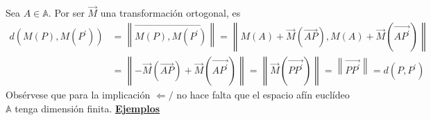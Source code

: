 \documentclass[12pt, a4paper, ones, notitlepage, openany,titlepage]{article}
\newcommand{\ejemplos}{\noindent\underline{\textbf{Ejemplos}}}
\begin{document}
{}{
	Sea $A \in \mathbb{A}$. Por ser $\overrightarrow{M}$ una transformación ortogonal, es
	$$
	\begin{aligned}
		d\left(M(P), M\left(P^{\prime}\right)\right) & =\left\|\overrightarrow{M(P), M\left(P^{\prime}\right)}\right\|=\left\|M(A)+\overrightarrow{M}(\overrightarrow{A P}), M(A)+\overrightarrow{M}\left(\overrightarrow{A P^{\prime}}\right)\right\| \\
		& =\left\|-\overrightarrow{M}(\overrightarrow{A P})+\overrightarrow{M}\left(\overrightarrow{A P^{\prime}}\right)\right\|=\left\|\overrightarrow{M}\left(\overrightarrow{P P^{\prime}}\right)\right\|=\left\|\overrightarrow{P P^{\prime}}\right\|=d\left(P, P^{\prime}\right)
	\end{aligned}
	$$
	Obsérvese que para la implicación $\Leftarrow/$ no hace falta que el espacio afín euclídeo $\mathbb{A}$ tenga dimensión finita.
}
\ejemplos
\end{document}
